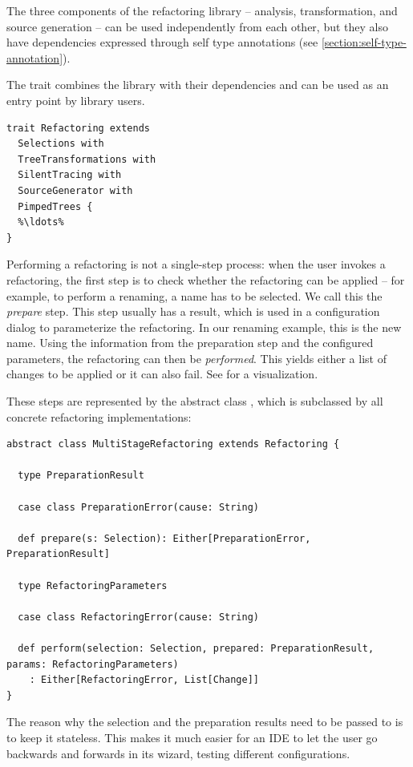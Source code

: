 \documentclass[10pt,a4paper,oneside]{scrreprt}
\begin{document}
The three components of the refactoring library -- analysis, transformation, and source generation -- can be used independently from each other, but they also have dependencies expressed through self type annotations (see \vref{section:self-type-annotation}). 

The  trait combines the library with their dependencies and can be used as an entry point by library users.

\begin{lstlisting}
trait Refactoring extends 
  Selections with 
  TreeTransformations with 
  SilentTracing with 
  SourceGenerator with 
  PimpedTrees {
  %\ldots%
}
\end{lstlisting}

Performing a refactoring is not a single-step process: when the user invokes a refactoring, the first step is to check whether the refactoring can be applied -- for example, to perform a renaming, a name has to be selected. We call this the \textit{prepare} step. This step usually has a result, which is used in a configuration dialog to parameterize the refactoring. In our renaming example, this is the new name. Using the information from the preparation step and the configured parameters, the refactoring can then be \textit{performed}. This yields either a list of changes to be applied or it can also fail. See   for a visualization.

These steps are represented by the abstract class , which is subclassed by all concrete refactoring implementations:
\begin{lstlisting}
abstract class MultiStageRefactoring extends Refactoring {
  
  type PreparationResult
  
  case class PreparationError(cause: String)

  def prepare(s: Selection): Either[PreparationError, PreparationResult]

  type RefactoringParameters
  
  case class RefactoringError(cause: String)
  
  def perform(selection: Selection, prepared: PreparationResult, params: RefactoringParameters)
    : Either[RefactoringError, List[Change]]
}
\end{lstlisting}

The reason why the selection and the preparation results need to be passed to  is to keep it stateless. This makes it much easier for an IDE to let the user go backwards and forwards in its wizard, testing different configurations.
\end{document}
